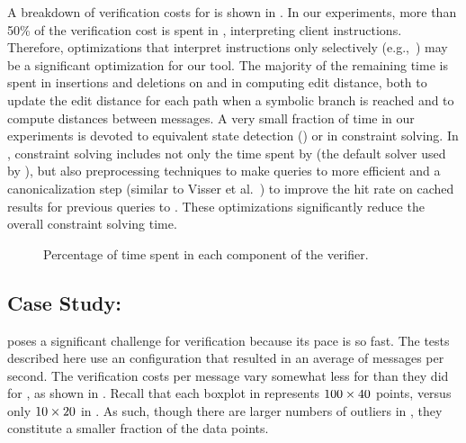 A breakdown of verification costs for \tetrinet is shown in
.  In our \tetrinet experiments,
more than 50\% of the verification cost is spent in \klee,
interpreting client instructions.  Therefore, optimizations that
interpret instructions only selectively (e.g.,~\cite{chipounov11:s2e})
may be a significant optimization for our tool.  The majority of the
remaining time is spent in insertions and deletions on \liveSet and in
computing edit distance, both to update the edit distance for each
path when a symbolic branch is reached and to compute distances
between messages.  A very small fraction of time in our \tetrinet
experiments is devoted to equivalent state detection
() or in constraint solving.  In
, constraint solving includes not only the
time spent by \stp (the default solver used by \klee), but also
preprocessing techniques to make queries to \stp more efficient and a
canonicalization step (similar to Visser et
al.~\cite{visser12:canonicalization}) to improve the hit rate on
cached results for previous queries to \stp.  These optimizations
significantly reduce the overall constraint solving time.

\begin{figure}[H]
\centering
{}
\caption{Percentage of time spent in each component of the verifier.}
\label{fig:time_summary}
\end{figure}

\subsection{Case Study: \xpilot}
\xpilot poses a significant challenge for verification because its
pace is so fast.  The tests described here use an \xpilot
configuration that resulted in an average of \xpilotMsgsPerSec
messages per second.  The verification costs per message vary somewhat
less for \xpilot than they did for \tetrinet, as shown in
.  Recall that each boxplot in
 represents $100 \times 40$ points,
versus only $10 \times 20$ in .
As such, though there are larger numbers of outliers in
, they constitute a smaller fraction of the
data points.

